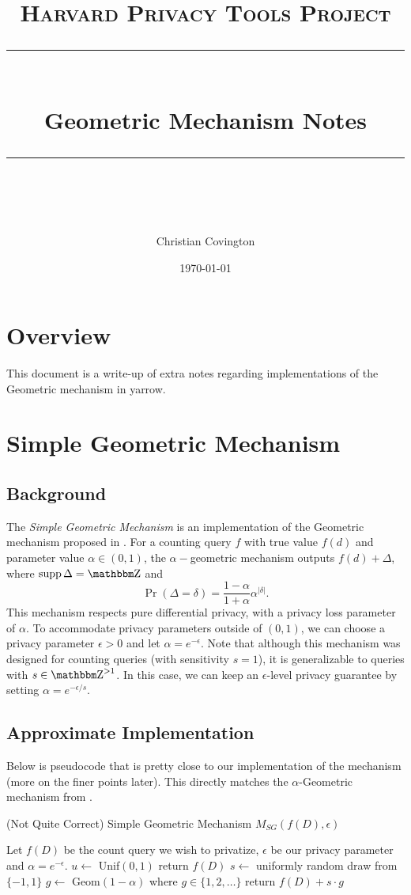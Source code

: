 \documentclass[11pt]{scrartcl} %
\title{
	\normalfont\normalsize
	\textsc{Harvard Privacy Tools Project}\\ %
	\vspace{25pt} %
	\rule{\linewidth}{0.5pt}\\ %
	\vspace{20pt} %
	{\huge Geometric Mechanism Notes}\\ %
	\vspace{12pt} %
	\rule{\linewidth}{2pt}\\ %
	\vspace{12pt} %
}
\author{\LARGE Christian Covington} %
\date{\normalsize\today} %
\begin{document}
\maketitle

\section{Overview}
This document is a write-up of extra notes regarding implementations of the Geometric mechanism
in yarrow.

\section{Simple Geometric Mechanism}
\subsection{Background}
The \emph{Simple Geometric Mechanism} is an implementation of the Geometric
mechanism proposed in \cite{GRS12}. For a counting query $f$ with true value $f(d)$
and parameter value $\alpha \in (0,1)$, the $\alpha-$geometric mechanism outputs
$f(d) + \Delta$, where $\supp \Delta = \Z$ and
\begin{equation}
    \label{eq:grs12_geom}
    \Pr(\Delta = \delta) = \frac{1-\alpha}{1+\alpha} \alpha^{| \delta |}.
\end{equation}
This mechanism respects pure differential privacy, with a privacy loss parameter of $\alpha$.
To accommodate privacy parameters outside of $(0,1)$, we can choose a privacy parameter
$\epsilon > 0$ and let $\alpha = e^{-\epsilon}$.
Note that although this mechanism was designed for counting queries (with sensitivity $s = 1$),
it is generalizable to queries with $s \in \Z^{> 1}$. In this case, we can keep an $\epsilon$-level
privacy guarantee by setting $\alpha = e^{-\epsilon / s}$. \newline

\subsection{Approximate Implementation}
Below is pseudocode that is pretty close to our implementation of the mechanism (more on the finer points later).
This directly matches the $\alpha$-Geometric mechanism from \cite{GRS12}.

\begin{algorithm}[H]
    \caption{(Not Quite Correct) Simple Geometric Mechanism $M_{SG}(f(D), \epsilon)$}
    \label{alg:simp_geo_mec}
    \begin{algorithmic}[1]
        \State Let $f(D)$ be the count query we wish to privatize, $\epsilon$ be our privacy parameter and $\alpha = e^{-\epsilon}$.
        \State $u \gets$ Unif$(0,1)$
         \label{alg_step:return_zero}
            \State return $f(D)$
        \Else
            \State $s \gets$ uniformly random draw from $\{-1, 1\}$ \label{alg:unif_draw}
            \State $g \gets$ Geom$(1 - \alpha)$ where $g \in \{1,2,\hdots\}$ \label{alg:draw_geom}
            \State return $f(D) + s \cdot g$
        \EndIf
	\end{algorithmic}
\end{algorithm}
\end{document}
